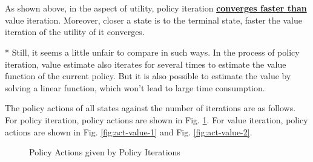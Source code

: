 \documentclass{article}
\begin{document}
\begin{figure*}[htbp]
    \centering
    \\
    \\
    \caption{Convergence of utilities of all states under value iteration and policy iteration}
    \label{fig:converge}
\end{figure*}

\vspace{-0.5em} \hspace{0.5em}
As shown above, in the aspect of utility, policy iteration \underline{\textbf{converges faster than}} value iteration. Moreover, closer a state is to the terminal state, faster the value iteration of the utility of it converges.

\hspace{0.5em}
* Still, it seems a little unfair to compare in such ways. In the process of policy iteration, value estimate also iterates for several times to estimate the value function of the current policy. But it is also possible to estimate the value by solving a linear function, which won't lead to large time consumption.

\vspace{1em} 
The policy actions of all states against the number of iterations are as follows. For policy iteration, policy actions are shown in Fig. \ref{fig:act-policy}. For value iteration, policy actions are shown in Fig. \ref{fig:act-value-1} and Fig. \ref{fig:act-value-2}. 

\begin{figure}[htbp]
    \centering
    \caption{Policy Actions given by Policy Iterations}
    \label{fig:act-policy}
\end{figure}
\end{document}
